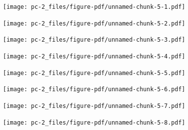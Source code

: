 \documentclass[
  letterpaper,
  DIV=11,
  numbers=noendperiod]{scrreprt}
\begin{document}
\begin{figure}[H]

{\centering \texttt{[image: pc-2\_files/figure-pdf/unnamed-chunk-5-1.pdf]}

}

\end{figure}

\begin{figure}[H]

{\centering \texttt{[image: pc-2\_files/figure-pdf/unnamed-chunk-5-2.pdf]}

}

\end{figure}

\begin{figure}[H]

{\centering \texttt{[image: pc-2\_files/figure-pdf/unnamed-chunk-5-3.pdf]}

}

\end{figure}

\begin{figure}[H]

{\centering \texttt{[image: pc-2\_files/figure-pdf/unnamed-chunk-5-4.pdf]}

}

\end{figure}

\begin{figure}[H]

{\centering \texttt{[image: pc-2\_files/figure-pdf/unnamed-chunk-5-5.pdf]}

}

\end{figure}

\begin{figure}[H]

{\centering \texttt{[image: pc-2\_files/figure-pdf/unnamed-chunk-5-6.pdf]}

}

\end{figure}

\begin{figure}[H]

{\centering \texttt{[image: pc-2\_files/figure-pdf/unnamed-chunk-5-7.pdf]}

}

\end{figure}

\begin{figure}[H]

{\centering \texttt{[image: pc-2\_files/figure-pdf/unnamed-chunk-5-8.pdf]}

}

\end{figure}
\end{document}
